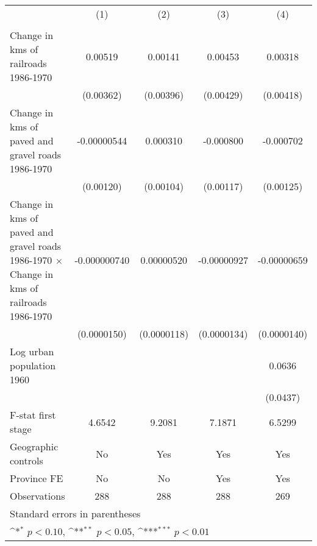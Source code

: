 {
\def\sym#1{\ifmmode^{#1}\else\(^{#1}\)\fi}
\begin{tabular}{l*{4}{c}}
\hline\hline
                &\multicolumn{1}{c}{(1)}&\multicolumn{1}{c}{(2)}&\multicolumn{1}{c}{(3)}&\multicolumn{1}{c}{(4)}\\
                &\multicolumn{1}{c}{}&\multicolumn{1}{c}{}&\multicolumn{1}{c}{}&\multicolumn{1}{c}{}\\
\hline
Change in kms of railroads 1986-1970&  0.00519         &  0.00141         &  0.00453         &  0.00318         \\
                &(0.00362)         &(0.00396)         &(0.00429)         &(0.00418)         \\
[1em]
Change in kms of paved and gravel roads 1986-1970&-0.00000544         & 0.000310         &-0.000800         &-0.000702         \\
                &(0.00120)         &(0.00104)         &(0.00117)         &(0.00125)         \\
[1em]
Change in kms of paved and gravel roads 1986-1970 $\times$ Change in kms of railroads 1986-1970&-0.000000740         &0.00000520         &-0.00000927         &-0.00000659         \\
                &(0.0000150)         &(0.0000118)         &(0.0000134)         &(0.0000140)         \\
[1em]
Log urban population 1960&                  &                  &                  &   0.0636         \\
                &                  &                  &                  & (0.0437)         \\
\hline
F-stat first stage&   4.6542         &   9.2081         &   7.1871         &   6.5299         \\
Geographic controls&       No         &      Yes         &      Yes         &      Yes         \\
Province FE     &       No         &       No         &      Yes         &      Yes         \\
Observations    &      288         &      288         &      288         &      269         \\
\hline\hline
\multicolumn{5}{l}{\footnotesize Standard errors in parentheses}\\
\multicolumn{5}{l}{\footnotesize \sym{*} \(p<0.10\), \sym{**} \(p<0.05\), \sym{***} \(p<0.01\)}\\
\end{tabular}
}
